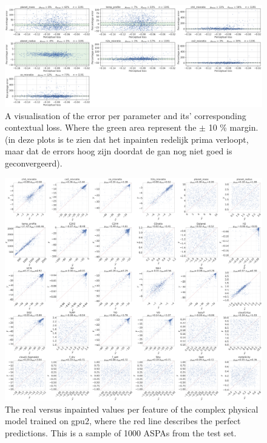\begin{figure} [!htb]
    \centering
    \includegraphics[width=\textwidth,height=\textheight,keepaspectratio]{figuren/perceptual errors.png}
    \caption{A visualisation of the error per parameter and its' corresponding contextual loss. Where the green area represent the $\pm$ 10 \% margin. (in deze plots is te zien dat het inpainten redelijk prima verloopt, maar dat de errors hoog zijn doordat de gan nog niet goed is geconvergeerd).}
    \label{fig:perceptual_errors}
\end{figure}






\begin{figure} [!htb]
    \centering
    \includegraphics[width=\textwidth,keepaspectratio]{figuren/small gpu2.png}
    \caption{The real versus inpainted values per feature of the complex physical model trained on gpu2, where the red line describes the perfect predictions. This is a sample of 1000 ASPAs from the test set.}
    \label{fig:gan_results_small_gpu2}
\end{figure}

